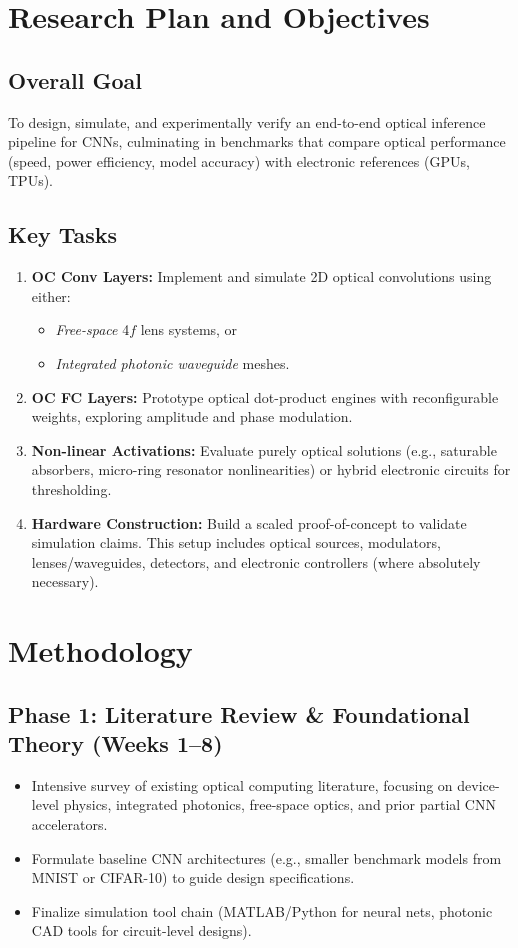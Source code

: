 \documentclass[conference]{IEEEtran}
\begin{document}
\section{Research Plan and Objectives}
\subsection{Overall Goal}
To design, simulate, and experimentally verify an end-to-end optical inference pipeline for CNNs, culminating in benchmarks that compare optical performance (speed, power efficiency, model accuracy) with electronic references (GPUs, TPUs).

\subsection{Key Tasks}
\begin{enumerate}
    \item \textbf{OC Conv Layers:} Implement and simulate 2D optical convolutions using either:
    \begin{itemize}
        \item \emph{Free-space} 4$f$ lens systems, or
        \item \emph{Integrated photonic waveguide} meshes.
    \end{itemize}
    \item \textbf{OC FC Layers:} Prototype optical dot-product engines with reconfigurable weights, exploring amplitude and phase modulation.
    \item \textbf{Non-linear Activations:} Evaluate purely optical solutions (e.g., saturable absorbers, micro-ring resonator nonlinearities) or hybrid electronic circuits for thresholding.
    \item \textbf{Hardware Construction:} Build a scaled proof-of-concept to validate simulation claims. This setup includes optical sources, modulators, lenses/waveguides, detectors, and electronic controllers (where absolutely necessary).
\end{enumerate}

\section{Methodology}

\subsection{Phase 1: Literature Review \& Foundational Theory (Weeks 1--8)}
\begin{itemize}
    \item Intensive survey of existing optical computing literature, focusing on device-level physics, integrated photonics, free-space optics, and prior partial CNN accelerators.
    \item Formulate baseline CNN architectures (e.g., smaller benchmark models from MNIST or CIFAR-10) to guide design specifications.
    \item Finalize simulation tool chain (MATLAB/Python for neural nets, photonic CAD tools for circuit-level designs).
\end{itemize}
\end{document}
